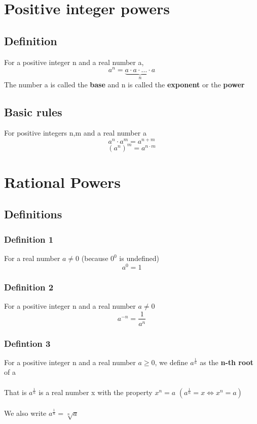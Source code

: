 \documentclass{article}[18pt]
\begin{document}
\section{Positive integer powers}
\subsection{Definition}
For a positive integer n and a real number a,
$$a ^ { n } = \underbrace { a \cdot a \cdot \ldots \cdot a } _ { n }$$
The number a is called the \textbf{base} and n is called the \textbf{exponent} or the \textbf{power}
\subsection{Basic rules}
For positive integers n,m and a real number a
$$a^n\cdot a^m=a^{n+m}$$
$$(a^n)^m=a^{n\cdot m}$$
\section{Rational Powers}
\subsection{Definitions}
\subsubsection{Definition 1}
For a real number $a\neq 0$ (because $0^0$ is undefined)
$$a^0=1$$
\subsubsection{Definition 2}
For a positive integer n and a real number $a\neq 0$
$$a^{-n}=\dfrac{1}{a^n}$$
\subsubsection{Defintion 3}
For a positive integer n and a real number $a\geqslant 0$, we define $a^{\frac{1}{n}}$ as the \textbf{n-th root} of a\\
\\
That is $a^{\frac{1}{n}}$ is a real number x with the property $x^n=a$ $(a^{\frac{1}{n}}=x\Leftrightarrow x^n=a)$\\
\\
We also write $a^{\frac{1}{n}}=\sqrt[n]{a}$
\end{document}
